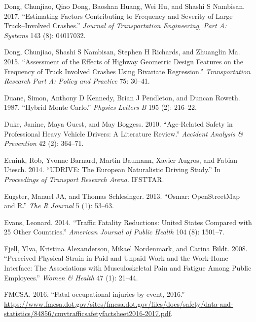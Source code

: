\documentclass[12pt]{book}
\numberwithin{equation}{chapter}
\begin{document}
\leavevmode\hypertarget{ref-dong2017estimating}{}%
Dong, Chunjiao, Qiao Dong, Baoshan Huang, Wei Hu, and Shashi S Nambisan. 2017. ``Estimating Factors Contributing to Frequency and Severity of Large Truck--Involved Crashes.'' \emph{Journal of Transportation Engineering, Part A: Systems} 143 (8): 04017032.

\leavevmode\hypertarget{ref-dong2015assessment}{}%
Dong, Chunjiao, Shashi S Nambisan, Stephen H Richards, and Zhuanglin Ma. 2015. ``Assessment of the Effects of Highway Geometric Design Features on the Frequency of Truck Involved Crashes Using Bivariate Regression.'' \emph{Transportation Research Part A: Policy and Practice} 75: 30--41.

\leavevmode\hypertarget{ref-duane1987hybrid}{}%
Duane, Simon, Anthony D Kennedy, Brian J Pendleton, and Duncan Roweth. 1987. ``Hybrid Monte Carlo.'' \emph{Physics Letters B} 195 (2): 216--22.

\leavevmode\hypertarget{ref-duke2010age}{}%
Duke, Janine, Maya Guest, and May Boggess. 2010. ``Age-Related Safety in Professional Heavy Vehicle Drivers: A Literature Review.'' \emph{Accident Analysis \& Prevention} 42 (2): 364--71.

\leavevmode\hypertarget{ref-eenink2014udrive}{}%
Eenink, Rob, Yvonne Barnard, Martin Baumann, Xavier Augros, and Fabian Utesch. 2014. ``UDRIVE: The European Naturalistic Driving Study.'' In \emph{Proceedings of Transport Research Arena}. IFSTTAR.

\leavevmode\hypertarget{ref-eugster2013osmar}{}%
Eugster, Manuel JA, and Thomas Schlesinger. 2013. ``Osmar: OpenStreetMap and R.'' \emph{The R Journal} 5 (1): 53--63.

\leavevmode\hypertarget{ref-evans2014traffic}{}%
Evans, Leonard. 2014. ``Traffic Fatality Reductions: United States Compared with 25 Other Countries.'' \emph{American Journal of Public Health} 104 (8): 1501--7.

\leavevmode\hypertarget{ref-fjell2008perceived}{}%
Fjell, Ylva, Kristina Alexanderson, Mikael Nordenmark, and Carina Bildt. 2008. ``Perceived Physical Strain in Paid and Unpaid Work and the Work-Home Interface: The Associations with Musculoskeletal Pain and Fatigue Among Public Employees.'' \emph{Women \& Health} 47 (1): 21--44.

\leavevmode\hypertarget{ref-fmcsafacts2016}{}%
FMCSA. 2016. ``Fatal occupational injuries by event, 2016.'' \url{https://www.fmcsa.dot.gov/sites/fmcsa.dot.gov/files/docs/safety/data-and-statistics/84856/cmvtrafficsafetyfactsheet2016-2017.pdf}.
\end{document}
